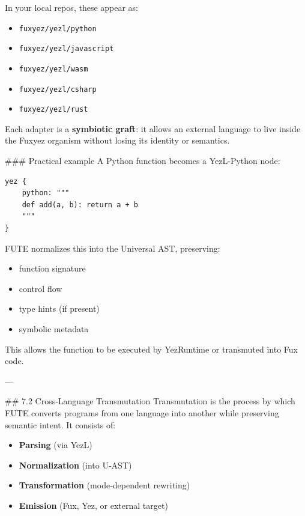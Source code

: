 In your local repos, these appear as:

\begin{itemize}
  \item \texttt{fuxyez/yezl/python}  
  \item \texttt{fuxyez/yezl/javascript}  
  \item \texttt{fuxyez/yezl/wasm}  
  \item \texttt{fuxyez/yezl/csharp}  
  \item \texttt{fuxyez/yezl/rust}  
\end{itemize}

Each adapter is a \textbf{symbiotic graft}: it allows an external language to live inside the Fuxyez organism without losing its identity or semantics.

\#\#\# Practical example  
A Python function becomes a YezL‑Python node:

\begin{lstlisting}[language=fuxyez]
yez {
    python: """
    def add(a, b): return a + b
    """
}

\end{lstlisting}

FUTE normalizes this into the Universal AST, preserving:

\begin{itemize}
  \item function signature  
  \item control flow  
  \item type hints (if present)  
  \item symbolic metadata  
\end{itemize}

This allows the function to be executed by YezRuntime or transmuted into Fux code.

---

\#\# 7.2 Cross‑Language Transmutation  
Transmutation is the process by which FUTE converts programs from one language into another while preserving semantic intent. It consists of:

\begin{itemize}
  \item \textbf{Parsing} (via YezL)  
  \item \textbf{Normalization} (into U‑AST)  
  \item \textbf{Transformation} (mode‑dependent rewriting)  
  \item \textbf{Emission} (Fux, Yez, or external target)  
\end{itemize}

